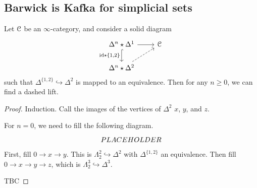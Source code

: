 \documentclass[main.tex]{subfiles}
\begin{document}
\subsection{Barwick is Kafka for simplicial sets}
\label{ssc:barwick_is_kafka_for_simplicial_sets}

\begin{lemma}
  \label{lemma:find_lift_internal_smash}
  Let $\mathcal{C}$ be an $\infty$-category, and consider a solid diagram
  \begin{equation*}
    \begin{tikzcd}
      \Delta^{n} \star \Delta^{1}
      \arrow[d, hook, swap, "{\id \star \{1, 2\}}"]
      \arrow[r]
      & \category{C}
      \\
      \Delta^{n} \star \Delta^{2}
      \arrow[ur, dashed]
    \end{tikzcd}
  \end{equation*}
  such that $\Delta^{\{1,2\}} \hookrightarrow \Delta^{2}$ is mapped to an equivalence. Then for any $n \geq 0$, we can find a dashed lift.
\end{lemma}
\begin{proof}
  Induction. Call the images of the vertices of $\Delta^{2}$ $x$, $y$, and $z$.

  For $n = 0$, we need to fill the following diagram.
  \begin{equation*}
    \begin{tikzcd}
      PLACEHOLDER
    \end{tikzcd}
  \end{equation*}
  First, fill $0 \to x \to y$. This is $\Lambda^{2}_{2} \hookrightarrow \Delta^{2}$ with $\Delta^{\{1, 2\}}$ an equivalence. Then fill $0 \to x \to y \to z$, which is $\Lambda^{3}_{2} \hookrightarrow \Delta^{3}$.

  TBC
\end{proof}
\end{document}
